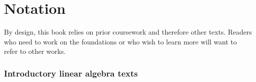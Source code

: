 \chapter*{Notation}

By design, this book relies on prior coursework and therefore other texts. Readers who need to work on the foundations or who wish to learn more will want to refer to other works.

\subsection*{Introductory linear algebra texts}


\endinput